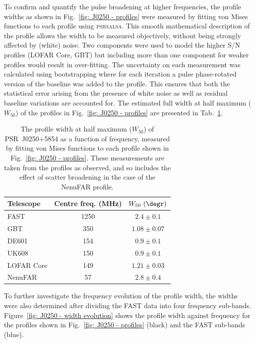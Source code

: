To confirm and quantify the pulse broadening at higher frequencies, the profile widths as shown in Fig.~\ref{fig: J0250 - profiles} were measured by fitting von Mises functions to each profile using \textsc{psrsalsa}. This smooth mathematical description of the profile allows the width to be measured objectively, without being strongly affected by (white) noise. Two components were used to model the higher S/N profiles (LOFAR Core, GBT) but including more than one component for weaker profiles would result in over-fitting. The uncertainty on each measurement was calculated using bootstrapping where for each iteration a pulse phase-rotated version of the baseline was added to the profile. This ensures that both the statistical error arising from the presence of white noise as well as residual baseline variations are accounted for. The estimated full width at half maximum ($W_{50}$) of the profiles in Fig.~\ref{fig: J0250 - profiles} are presented in Tab.~\ref{tab: J0250 - W50}.
\begin{table}
    \centering
    \caption[The measured profile widths of PSR~J0250+5854 across the observed frequency range]{The profile width at half maximum ($W_{50}$) of PSR~J0250+5854 as a function of frequency, measured by fitting von Mises functions to each profile shown in Fig.~\ref{fig: J0250 - profiles}. These measurements are taken from the profiles as observed, and so includes the effect of scatter broadening in the case of the NenuFAR profile.}
    \label{tab: J0250 - W50}
    \begin{tabular}{lcc}
        \hline
        Telescope & Centre freq. (MHz) & $W_{50}~(\degr)$ \\
        \hline
        FAST & 1250 & $2.4\pm0.1$ \\
        GBT & 350 & $1.08\pm0.07$ \\
        DE601 & 154 & $0.9\pm0.1$ \\
        UK608 & 150 & $0.9\pm0.1$ \\
        LOFAR Core & 149 & $1.21\pm0.03$ \\
        NenuFAR & 57 & $2.8\pm0.4$ \\ 
    \end{tabular}
\end{table}
To further investigate the frequency evolution of the profile width, the widths were also determined after dividing the FAST data into four frequency sub-bands. Figure~\ref{fig: J0250 - width evolution} shows the profile width against frequency for the profiles shown in Fig.~\ref{fig: J0250 - profiles} (black) and the FAST sub-bands (blue).

